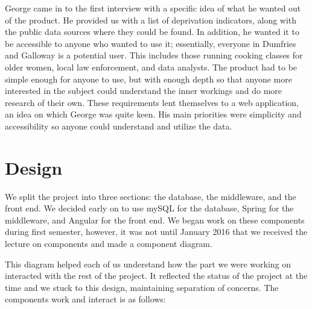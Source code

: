 \documentclass{l3proj}
\begin{document}
George came in to the first interview with a specific idea of what he wanted out of the product. He provided us with a list of deprivation indicators, along with the public data sources where they could be found. In addition, he wanted it to be accessible to anyone who wanted to use it; essentially, everyone in Dumfries and Galloway is a potential user. This includes those running cooking classes for older women, local law enforcement, and data analysts. The product had to be simple enough for anyone to use, but with enough depth so that anyone more interested in the subject could understand the inner workings and do more research of their own. These requirements lent themselves to a web application, an idea on which George was quite keen. His main priorities were simplicity and accessibility so anyone could understand and utilize the data.

\section{Design}
\label{designdocs}

We split the project into three sections: the database, the middleware, and the front end. We decided early on to use mySQL for the database, Spring for the middleware, and Angular for the front end. We began work on these components during first semester, however, it was not until January 2016 that we received the lecture on components and made a component diagram.



This diagram helped each of us understand how the part we were working on interacted with the rest of the project. It reflected the status of the project at the time and we stuck to this design, maintaining separation of concerns. The components work and interact is as follows:
\end{document}
